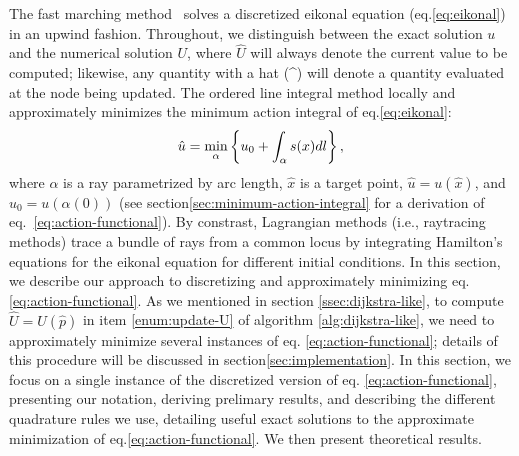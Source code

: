 \documentclass[smallcondensed]{svjour3}
\begin{document}
The fast marching method~\cite{sethian1996fast} solves a discretized
eikonal equation (eq.\@ \ref{eq:eikonal}) in an upwind
fashion. Throughout, we distinguish between the exact solution $u$ and
the numerical solution $U$, where $\hat{U}$ will always denote the
current value to be computed; likewise, any quantity with a hat (\^{})
will denote a quantity evaluated at the node being updated. The
ordered line integral method locally and approximately minimizes the
minimum action integral of eq.\@ \ref{eq:eikonal}:
\begin{equation}
  \label{eq:action-functional}
  \hat{u} = \min_{\alpha} \left\{u_0 + \int_\alpha s(x) dl\right\},
\end{equation}
where $\alpha$ is a ray parametrized by arc length, $\hat{x}$ is a
target point, $\hat{u} = u(\hat{x})$, and $u_0 = u(\alpha(0))$ (see
section\@ \ref{sec:minimum-action-integral} for a derivation of eq.\
\ref{eq:action-functional}). By constrast, Lagrangian methods (i.e.,
raytracing methods) trace a bundle of rays from a common locus by
integrating Hamilton's equations for the eikonal equation for
different initial conditions. In this section, we describe our
approach to discretizing and approximately minimizing eq.\@
\ref{eq:action-functional}. As we mentioned in section\@
\ref{ssec:dijkstra-like}, to compute $\hat{U} = U(\hat{p})$ in item
\ref{enum:update-U} of algorithm \ref{alg:dijkstra-like}, we need to
approximately minimize several instances of eq.\@
\ref{eq:action-functional}; details of this procedure will be
discussed in section\@ \ref{sec:implementation}. In this section, we
focus on a single instance of the discretized version of eq.\@
\ref{eq:action-functional}, presenting our notation, deriving
prelimary results, and describing the different quadrature rules we
use, detailing useful exact solutions to the approximate minimization
of eq.\@ \ref{eq:action-functional}. We then present theoretical
results.
\end{document}
